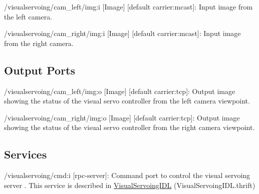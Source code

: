 \begin{DoxyItemize}
\item /visualservoing/cam\+\_\+left/img\+:i \mbox{[}Image\mbox{]} \mbox{[}default carrier\+:mcast\mbox{]}\+: Input image from the left camera.
\item /visualservoing/cam\+\_\+right/img\+:i \mbox{[}Image\mbox{]} \mbox{[}default carrier\+:mcast\mbox{]}\+: Input image from the right camera.
\end{DoxyItemize}\hypertarget{group__visualservoingserver_outputports_sec}{}\subsection{Output Ports}\label{group__visualservoingserver_outputports_sec}

\begin{DoxyItemize}
\item /visualservoing/cam\+\_\+left/img\+:o \mbox{[}Image\mbox{]} \mbox{[}default carrier\+:tcp\mbox{]}\+: Output image showing the status of the visual servo controller from the left camera viewpoint.
\item /visualservoing/cam\+\_\+right/img\+:o \mbox{[}Image\mbox{]} \mbox{[}default carrier\+:tcp\mbox{]}\+: Output image showing the status of the visual servo controller from the right camera viewpoint.
\end{DoxyItemize}\hypertarget{group__visualservoingserver_services_sec}{}\subsection{Services}\label{group__visualservoingserver_services_sec}

\begin{DoxyItemize}
\item /visualservoing/cmd\+:i \mbox{[}rpc-\/server\mbox{]}\+: Command port to control the visual servoing server . This service is described in \hyperlink{classVisualServoingIDL}{Visual\+Servoing\+I\+DL} (Visual\+Servoing\+I\+D\+L.\+thrift) 
\end{DoxyItemize}